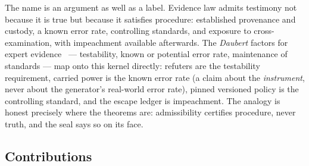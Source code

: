 \documentclass[11pt,a4paper]{article}
\theoremstyle{plain}
\theoremstyle{definition}
\theoremstyle{remark}
\begin{document}
The name is an argument as well as a label. Evidence law admits testimony not because it is true but because it satisfies procedure: established provenance and custody, a known error rate, controlling standards, and exposure to cross-examination, with impeachment available afterwards. The \emph{Daubert} factors for expert evidence~\cite{daubert} --- testability, known or potential error rate, maintenance of standards --- map onto this kernel directly: refuters are the testability requirement, carried power is the known error rate (a claim about the \emph{instrument}, never about the generator's real-world error rate), pinned versioned policy is the controlling standard, and the escape ledger is impeachment. The analogy is honest precisely where the theorems are: admissibility certifies procedure, never truth, and the seal says so on its face.

\subsection{Contributions}
\end{document}
